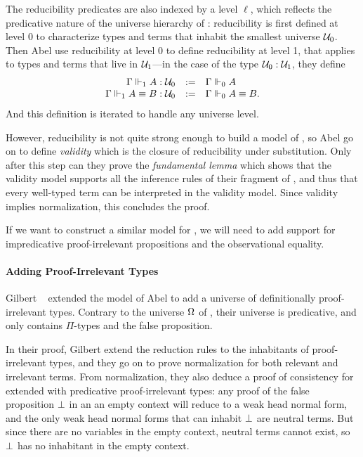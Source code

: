 The reducibility predicates are also indexed by a level \( \ell \), which reflects 
the predicative nature of the universe hierarchy of \MLTT: reducibility is 
first defined at level $0$ to characterize types and terms that inhabit the 
smallest universe \( \Type_0 \).
% 
Then Abel \etal use reducibility at level 0 to define reducibility at level 1, 
that applies to types and terms that live in \( \Type_1 \)---in the case of
the type \( \Type_0 : \Type_1 \), they define
\[
\begin{array}{rcl}
  \tytmReco{1}{\Gamma}{A}{\Type_0}{\Type_1} & := & \tytyReco{0}{\Gamma}{A}{\Type_0} \\
  \eqtmReco{1}{\Gamma}{A}{B}{\Type_0}{\Type_1} & := & \eqtyReco{0}{\Gamma}{A}{B}{\Type_0}. 
\end{array}
\]
% 
And this definition is iterated to handle any universe level.

However, reducibility is not quite strong enough to build a model of \MLTT, 
so Abel \etal go on to define \emph{validity} which is the closure 
of reducibility under substitution.
% 
Only after this step can they prove the \emph{fundamental lemma} which shows 
that the validity model supports all the inference rules of their fragment of
\MLTT, and thus that every well-typed term can be interpreted in the validity
model. Since validity implies normalization, this concludes the proof.

If we want to construct a similar model for \SetoidCC, we will need to add
support for impredicative proof-irrelevant propositions and the observational 
equality.

\paragraph*{Adding Proof-Irrelevant Types}
% 
Gilbert \etal~ extended the model of 
Abel \etal to add a universe of definitionally proof-irrelevant types.
Contrary to the universe \( \sProp \) of \SetoidCC, their universe is
predicative, and only contains \( \Pi \)-types and the false proposition.

In their proof, Gilbert \etal extend the reduction rules to the inhabitants of 
proof-irrelevant types, and they go on to prove normalization for both relevant
and irrelevant terms.
%
From normalization, they also deduce a proof of consistency for \MLTT 
extended with predicative proof-irrelevant types: any proof of the false 
proposition \( \Empty \) in an an empty context will reduce to a weak head 
normal form, and the only weak head normal forms that can inhabit 
\( \Empty \) are neutral terms. 
% 
But since there are no variables in the empty context, neutral terms cannot 
exist, so \( \Empty \) has no inhabitant in the empty context.


